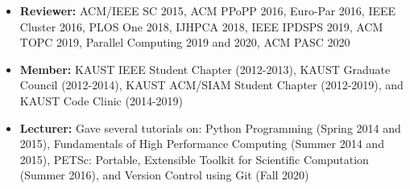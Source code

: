 \documentclass[9pt,a4paper]{extarticle}
\begin{document}
{
\begin{itemize}
\item
\textbf{Reviewer:} ACM/IEEE SC 2015, ACM PPoPP 2016, Euro-Par 2016, IEEE Cluster 2016,
PLOS One 2018, IJHPCA 2018, IEEE IPDSPS 2019, ACM TOPC 2019,
Parallel Computing 2019 and 2020, ACM PASC 2020
\item
\textbf{Member:} KAUST IEEE Student Chapter (2012-2013),
KAUST Graduate Council (2012-2014), KAUST ACM/SIAM Student Chapter (2012-2019),
and KAUST Code Clinic (2014-2019)
\item
\textbf{Lecturer:} Gave several tutorials on: Python Programming (Spring 2014 and 2015),
Fundamentals of High Performance Computing (Summer 2014 and 2015),
PETSc: Portable, Extensible Toolkit for Scientific Computation (Summer 2016),
and Version Control using Git (Fall 2020)
\end{itemize}
}
\end{document}

